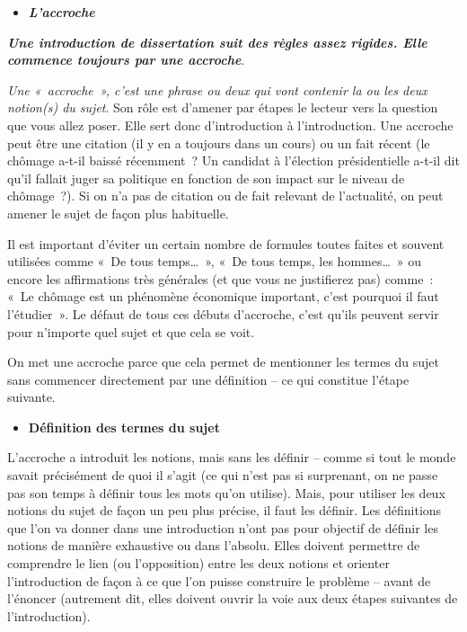 \documentclass[
  letterpaper,
  DIV=11,
  numbers=noendperiod]{scrartcl}
\providecommand{\tightlist}{%
  \setlength{\itemsep}{0pt}\setlength{\parskip}{0pt}}\usepackage{longtable,booktabs,array}
\begin{document}
\begin{itemize}
\tightlist
\item
  \textbf{\emph{L'accroche}}
\end{itemize}

\textbf{\emph{Une introduction de dissertation suit des règles assez
rigides. Elle commence toujours par une accroche}}.

\emph{Une «~accroche~», c'est une phrase ou deux qui vont contenir la ou
les deux notion(s) du sujet}. Son rôle est d'amener par étapes le
lecteur vers la question que vous allez poser. Elle sert donc
d'introduction à l'introduction. Une accroche peut être une citation (il
y en a toujours dans un cours) ou un fait récent (le chômage a-t-il
baissé récemment~? Un candidat à l'élection présidentielle a-t-il dit
qu'il fallait juger sa politique en fonction de son impact sur le niveau
de chômage~?). Si on n'a pas de citation ou de fait relevant de
l'actualité, on peut amener le sujet de façon plus habituelle.

Il est important d'éviter un certain nombre de formules toutes faites et
souvent utilisées comme «~De tous temps\ldots~», «~De tous temps, les
hommes\ldots~» ou encore les affirmations très générales (et que vous ne
justifierez pas) comme~: «~Le chômage est un phénomène économique
important, c'est pourquoi il faut l'étudier~». Le défaut de tous ces
débuts d'accroche, c'est qu'ils peuvent servir pour n'importe quel sujet
et que cela se voit.

On met une accroche parce que cela permet de mentionner les termes du
sujet sans commencer directement par une définition -- ce qui constitue
l'étape suivante.

\begin{itemize}
\tightlist
\item
  \textbf{Définition des termes du sujet}
\end{itemize}

L'accroche a introduit les notions, mais sans les définir -- comme si
tout le monde savait précisément de quoi il s'agit (ce qui n'est pas si
surprenant, on ne passe pas son temps à définir tous les mots qu'on
utilise). Mais, pour utiliser les deux notions du sujet de façon un peu
plus précise, il faut les définir. Les définitions que l'on va donner
dans une introduction n'ont pas pour objectif de définir les notions de
manière exhaustive ou dans l'absolu. Elles doivent permettre de
comprendre le lien (ou l'opposition) entre les deux notions et orienter
l'introduction de façon à ce que l'on puisse construire le problème --
avant de l'énoncer (autrement dit, elles doivent ouvrir la voie aux deux
étapes suivantes de l'introduction).
\end{document}
